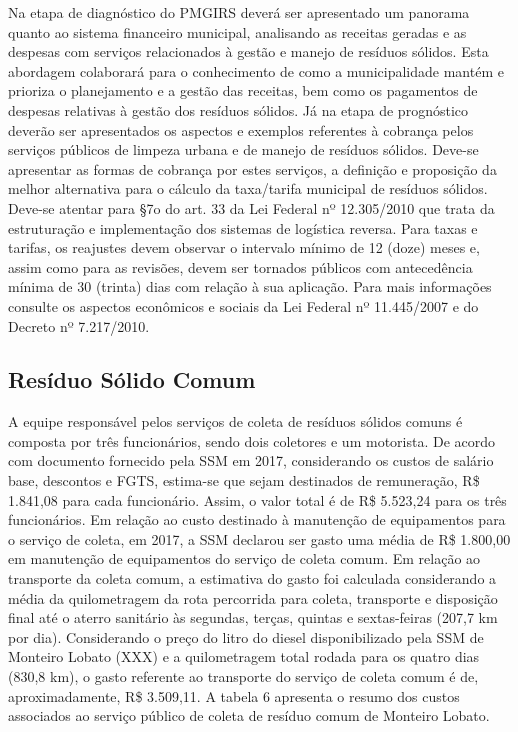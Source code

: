 	Na etapa de diagnóstico do PMGIRS deverá ser apresentado um panorama quanto ao sistema financeiro municipal, analisando as receitas geradas e as despesas com serviços relacionados à gestão e manejo de resíduos sólidos. Esta abordagem colaborará para o conhecimento de como a municipalidade mantém e prioriza o planejamento e a gestão das receitas, bem como os pagamentos de despesas relativas à gestão dos resíduos sólidos.
	Já na etapa de prognóstico deverão ser apresentados os aspectos e exemplos referentes à cobrança pelos serviços públicos de limpeza urbana e de manejo de resíduos sólidos. Deve-se apresentar as formas de cobrança por estes serviços, a definição e proposição da melhor alternativa para o cálculo da taxa/tarifa municipal de resíduos sólidos.
	Deve-se atentar para §7o do art. 33 da Lei Federal nº 12.305/2010 que trata da estruturação e implementação dos sistemas de logística reversa.
	Para taxas e tarifas, os reajustes devem observar o intervalo mínimo de 12 (doze) meses e, assim como para as revisões, devem ser tornados públicos com antecedência mínima de 30 (trinta) dias com relação à sua aplicação.
	Para mais informações consulte os aspectos econômicos e sociais da Lei Federal nº 11.445/2007 e do Decreto nº 7.217/2010.


\subsection{Resíduo Sólido Comum}
	A equipe responsável pelos serviços de coleta de resíduos sólidos comuns é composta por três funcionários, sendo dois coletores e um motorista. De acordo com documento fornecido pela SSM em 2017, considerando os custos de salário base, descontos e FGTS, estima-se que sejam destinados de remuneração, R\$ 1.841,08 para cada funcionário. Assim, o valor total é de R\$ 5.523,24 para os três funcionários.
	Em relação ao custo destinado à manutenção de equipamentos para o serviço de coleta, em 2017, a SSM declarou ser gasto uma média de R\$ 1.800,00 em manutenção de equipamentos do serviço de coleta comum.
	Em relação ao transporte da coleta comum, a estimativa do gasto foi calculada considerando a média da quilometragem da rota percorrida para coleta, transporte e disposição final até o aterro sanitário às segundas, terças, quintas e sextas-feiras (207,7 km por dia). 
	Considerando o preço do litro do diesel disponibilizado pela SSM de Monteiro Lobato (XXX) e a quilometragem total rodada para os quatro dias (830,8 km), o gasto referente ao transporte do serviço de coleta comum é de, aproximadamente, R\$ 3.509,11. A tabela 6 apresenta o resumo dos custos associados ao serviço público de coleta de resíduo comum de Monteiro Lobato.
	
